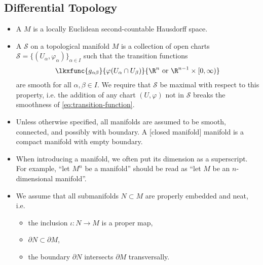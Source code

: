 \subsection*{Differential Topology}
\begin{itemize}
  \item A  $M$ is a locally Euclidean second-countable Hausdorff space. 
  \item A  $\mathscr{S}$ on a topological manifold $M$ is a collection of open charts $\mathscr{S}=\{(U_\alpha, \varphi_\alpha)\}_{\alpha\in I}$ such that the transition functions 
	\begin{equation}\label{eq:transition-function}
		\lkxfunc{g_{\alpha\beta}}{\varphi(U_\alpha\cap U_\beta)}{\R^n\textrm{ or } \R^{n-1}\times [0,\infty)}
	\end{equation}
	are smooth for all $\alpha,\beta\in I$. We require that $\mathscr{S}$ be maximal with respect to this property, i.e. the addition of any chart $(U,\varphi)$ not in $\mathscr{S}$ breaks the smoothness of \cref{eq:transition-function}.
  \item Unless otherwise specified, all manifolds are assumed to be smooth, connected, and possibly with boundary. A [closed manifold] manifold is a compact manifold with empty boundary.
  \item When introducing a manifold, we often put its dimension as a superscript. For example, ``let $M^n$ be a manifold'' should be read as ``let $M$ be an $n$-dimensional manifold''.

  \item We assume that all submanifolds $N\subset M$ are properly embedded and neat, i.e.
    \vspace{-0.5em}
    \begin{itemize}
      \item the inclusion $\iota : N \to M$ is a proper map,
      \item $\partial N\subset \partial M$,
      \item the boundary $\partial N$ intersects $\partial M$ transversally.
    \end{itemize}
\end{itemize}

